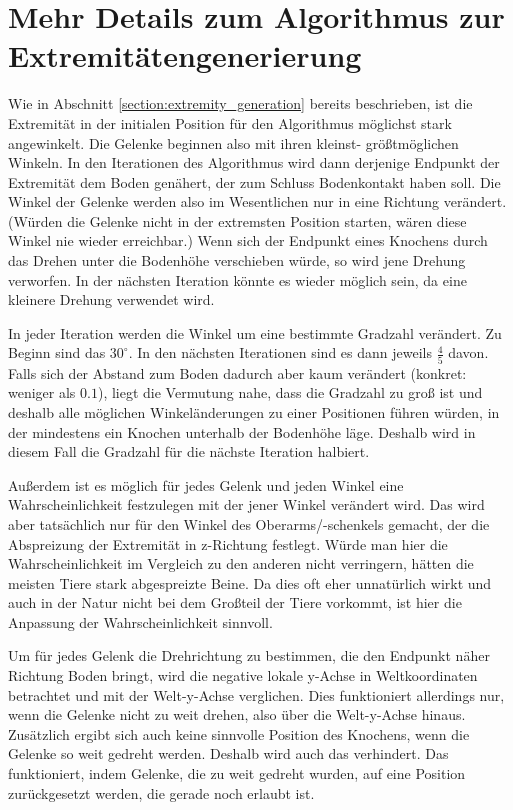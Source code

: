 \section{Mehr Details zum Algorithmus zur Extremitätengenerierung}

Wie in Abschnitt \ref{section:extremity_generation} bereits beschrieben, ist die Extremität in der initialen Position für den Algorithmus möglichst stark angewinkelt. Die Gelenke beginnen also mit ihren kleinst- \bzw größtmöglichen Winkeln. In den Iterationen des Algorithmus wird dann derjenige Endpunkt der Extremität dem Boden genähert, der zum Schluss Bodenkontakt haben soll. Die Winkel der Gelenke werden also im Wesentlichen nur in eine Richtung verändert. (Würden die Gelenke nicht in der extremsten Position starten, wären diese Winkel nie wieder erreichbar.)
Wenn sich der Endpunkt eines Knochens durch das Drehen unter die Bodenhöhe verschieben würde, so wird jene Drehung verworfen. In der nächsten Iteration könnte es wieder möglich sein, da eine kleinere Drehung verwendet wird.

In jeder Iteration werden die Winkel um eine bestimmte Gradzahl verändert. Zu Beginn sind das $30^{\circ}$. In den nächsten Iterationen sind es dann jeweils $\frac{4}{5}$ davon. Falls sich der Abstand zum Boden dadurch aber kaum verändert (konkret: weniger als $0.1$), liegt die Vermutung nahe, dass die Gradzahl zu groß ist und deshalb alle möglichen Winkeländerungen zu einer Positionen führen würden, in der mindestens ein Knochen unterhalb der Bodenhöhe läge. Deshalb wird in diesem Fall die Gradzahl für die nächste Iteration halbiert.

Außerdem ist es möglich für jedes Gelenk und jeden Winkel eine Wahrscheinlichkeit festzulegen mit der jener Winkel verändert wird. Das wird aber tatsächlich nur für den Winkel des Oberarms/-schenkels gemacht, der die Abspreizung der Extremität in z-Richtung festlegt. Würde man hier die Wahrscheinlichkeit im Vergleich zu den anderen nicht verringern, hätten die meisten Tiere stark abgespreizte Beine. Da dies oft eher unnatürlich wirkt und auch in der Natur nicht bei dem Großteil der Tiere vorkommt, ist hier die Anpassung der Wahrscheinlichkeit sinnvoll.

Um für jedes Gelenk die Drehrichtung zu bestimmen, die den Endpunkt näher Richtung Boden bringt, wird die negative lokale y-Achse in Weltkoordinaten betrachtet und mit der Welt-y-Achse verglichen. 
Dies funktioniert allerdings nur, wenn die Gelenke nicht zu weit drehen, also über die Welt-y-Achse hinaus. Zusätzlich ergibt sich auch keine sinnvolle Position des Knochens, wenn die Gelenke so weit gedreht werden. Deshalb wird auch das verhindert. Das funktioniert, indem Gelenke, die zu weit gedreht wurden, auf eine Position zurückgesetzt werden, die gerade noch erlaubt ist.

